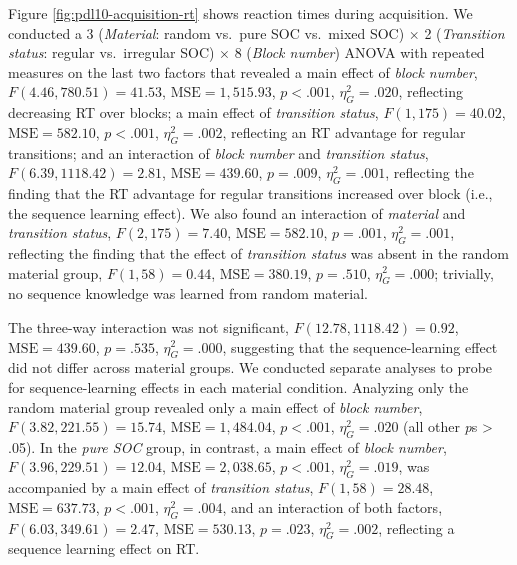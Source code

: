 \documentclass[jou]{apa6}
\theoremstyle{definition}
\theoremstyle{definition}
\theoremstyle{definition}
\theoremstyle{remark}
\begin{document}
Figure \ref{fig:pdl10-acquisition-rt} shows reaction times during
acquisition. We conducted a 3 (\emph{Material}: random vs.~pure SOC
vs.~mixed SOC) \(\times\) 2 (\emph{Transition status}: regular
vs.~irregular SOC) \(\times\) 8 (\emph{Block number}) ANOVA with
repeated measures on the last two factors that revealed a main effect of
\emph{block number}, \(F(4.46, 780.51) = 41.53\),
\(\mathrm{MSE} = 1,515.93\), \(p < .001\), \(\eta^2_G = .020\),
reflecting decreasing RT over blocks; a main effect of \emph{transition
status}, \(F(1, 175) = 40.02\), \(\mathrm{MSE} = 582.10\), \(p < .001\),
\(\eta^2_G = .002\), reflecting an RT advantage for regular transitions;
and an interaction of \emph{block number} and \emph{transition status},
\(F(6.39, 1118.42) = 2.81\), \(\mathrm{MSE} = 439.60\), \(p = .009\),
\(\eta^2_G = .001\), reflecting the finding that the RT advantage for
regular transitions increased over block (i.e., the sequence learning
effect). We also found an interaction of \emph{material} and
\emph{transition status}, \(F(2, 175) = 7.40\),
\(\mathrm{MSE} = 582.10\), \(p = .001\), \(\eta^2_G = .001\), reflecting
the finding that the effect of \emph{transition status} was absent in
the random material group, \(F(1, 58) = 0.44\),
\(\mathrm{MSE} = 380.19\), \(p = .510\), \(\eta^2_G = .000\); trivially,
no sequence knowledge was learned from random material.

The three-way interaction was not significant,
\(F(12.78, 1118.42) = 0.92\), \(\mathrm{MSE} = 439.60\), \(p = .535\),
\(\eta^2_G = .000\), suggesting that the sequence-learning effect did
not differ across material groups. We conducted separate analyses to
probe for sequence-learning effects in each material condition.
Analyzing only the random material group revealed only a main effect of
\emph{block number}, \(F(3.82, 221.55) = 15.74\),
\(\mathrm{MSE} = 1,484.04\), \(p < .001\), \(\eta^2_G = .020\) (all
other \emph{p}s \textgreater{} .05). In the \emph{pure SOC} group, in
contrast, a main effect of \emph{block number},
\(F(3.96, 229.51) = 12.04\), \(\mathrm{MSE} = 2,038.65\), \(p < .001\),
\(\eta^2_G = .019\), was accompanied by a main effect of
\emph{transition status}, \(F(1, 58) = 28.48\),
\(\mathrm{MSE} = 637.73\), \(p < .001\), \(\eta^2_G = .004\), and an
interaction of both factors, \(F(6.03, 349.61) = 2.47\),
\(\mathrm{MSE} = 530.13\), \(p = .023\), \(\eta^2_G = .002\), reflecting
a sequence learning effect on RT.
\end{document}
